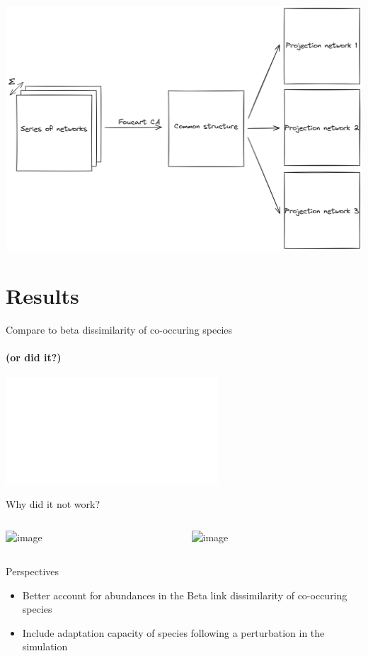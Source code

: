 \documentclass{beamer}
\begin{document}
\begin{frame}{}
\protect\hypertarget{foucart-ca}{}
\\ [0.5cm]
\includegraphics[width=0.9\linewidth]{figures_slides/foucart.png}%
\end{frame}

\section{Results}

\begin{frame}{Compare to beta dissimilarity of co-occuring species}
  \framesubtitle{(or did it?)}
  \includegraphics<1->[width=\linewidth]{figures_slides/rewiring.pdf}%
\end{frame}


\begin{frame}{Why did it not work?}
  \begin{columns}
    \begin{column}{.5\linewidth}
      \includegraphics<1->[width=\linewidth]{figures_slides/foucart_limits.png}%
    \end{column}
    \begin{column}{.5\linewidth}
      \includegraphics<2->[width=\linewidth]{figures_slides/simulation_limits.png}%
    \end{column}
  \end{columns}
\end{frame}

\begin{frame}{Perspectives}
\protect\hypertarget{perspectives}{}
\begin{itemize}
\item
  Better account for abundances in the Beta link dissimilarity of co-occuring species
\item
  Include adaptation capacity of species following a perturbation in the simulation
\end{itemize}
\end{frame}
\end{document}
